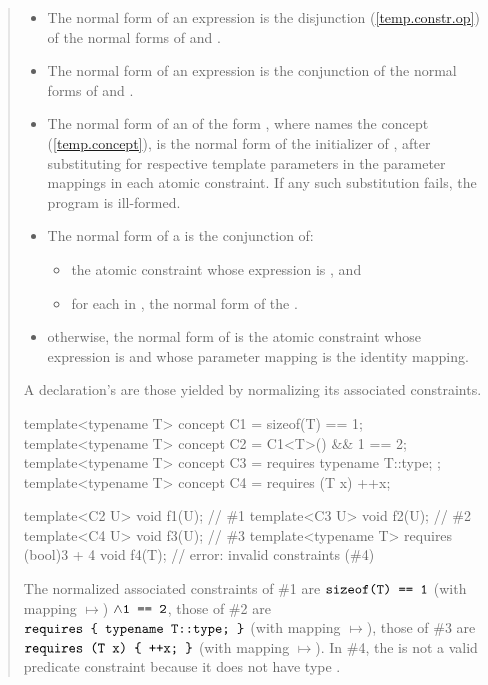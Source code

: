\begin{quote}
\begin{addedblock}
\begin{itemize}
\item The normal form of an expression  is the  
disjunction (\ref{temp.constr.op}) of the normal forms of  
and .

\item The normal form of an expression  is the  
conjunction of the normal forms of  
and .

\item The normal form of an  of the form
, where  names the concept
 (\ref{temp.concept}),
is the normal form of the initializer of ,
after substituting  for
 respective template parameters in the
parameter mappings in each atomic constraint.
If any such substitution fails, the program is ill-formed.

\item The normal form of a   is
the conjunction of:
\begin{itemize}
\item the atomic constraint whose expression is , and
\item for each  in , the
normal form of the .
\end{itemize}

\item otherwise, the normal form of  is the atomic constraint
whose expression is  and whose parameter mapping is the
identity mapping.
\end{itemize}
% 
A declaration's  are those
yielded by normalizing its associated constraints.
% 
\enterexample
\begin{codeblock}
template<typename T> concept C1 = sizeof(T) == 1;
template<typename T> concept C2 = C1<T>() && 1 == 2;
template<typename T> concept C3 = requires { typename T::type; };
template<typename T> concept C4 = requires (T x) { ++x; }

template<C2 U> void f1(U);                            // \#1
template<C3 U> void f2(U);                            // \#2
template<C4 U> void f3(U);                            // \#3
template<typename T> requires (bool)3 + 4 void f4(T); // error: invalid constraints (\#4)
\end{codeblock}
The normalized associated constraints of \#1 are 
$\texttt{sizeof(T) == 1}$ (with mapping $\mapsto$) $\land \texttt{1 == 2}$,
% 
those of \#2 are
$\texttt{requires \{ typename T::type; \}}$ (with mapping $\mapsto$),
%
those of \#3 are
$\texttt{requires (T x) \{ ++x; \}}$ (with mapping $\mapsto$).
% 
In \#4, the  
is not a valid predicate constraint because it does not have type .
\exitexample



\end{addedblock}
\end{quote}
